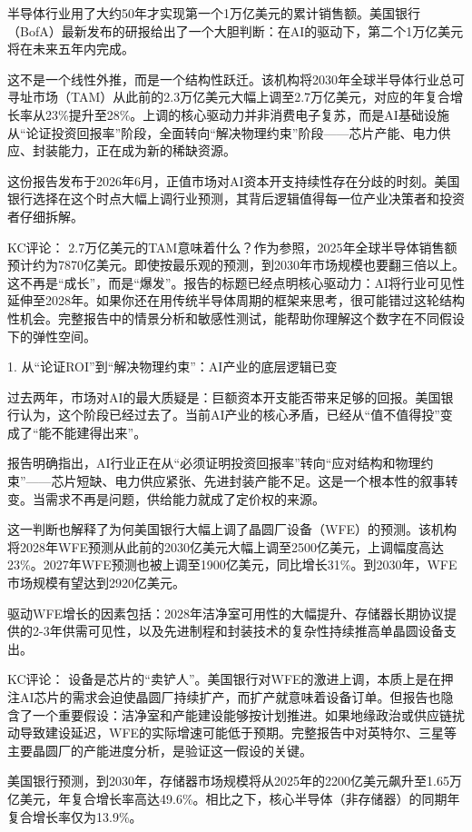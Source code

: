 \documentclass[11pt]{ctexart}
\begin{document}
半导体行业用了大约50年才实现第一个1万亿美元的累计销售额。美国银行（BofA）最新发布的研报给出了一个大胆判断：在AI的驱动下，第二个1万亿美元将在未来五年内完成。

这不是一个线性外推，而是一个结构性跃迁。该机构将2030年全球半导体行业总可寻址市场（TAM）从此前的2.3万亿美元大幅上调至2.7万亿美元，对应的年复合增长率从23\%提升至28\%。上调的核心驱动力并非消费电子复苏，而是AI基础设施从“论证投资回报率”阶段，全面转向“解决物理约束”阶段——芯片产能、电力供应、封装能力，正在成为新的稀缺资源。

这份报告发布于2026年6月，正值市场对AI资本开支持续性存在分歧的时刻。美国银行选择在这个时点大幅上调行业预测，其背后逻辑值得每一位产业决策者和投资者仔细拆解。

KC评论： 2.7万亿美元的TAM意味着什么？作为参照，2025年全球半导体销售额预计约为7870亿美元。即使按最乐观的预测，到2030年市场规模也要翻三倍以上。这不再是“成长”，而是“爆发”。报告的标题已经点明核心驱动力：AI将行业可见性延伸至2028年。如果你还在用传统半导体周期的框架来思考，很可能错过这轮结构性机会。完整报告中的情景分析和敏感性测试，能帮助你理解这个数字在不同假设下的弹性空间。

1. 从“论证ROI”到“解决物理约束”：AI产业的底层逻辑已变

过去两年，市场对AI的最大质疑是：巨额资本开支能否带来足够的回报。美国银行认为，这个阶段已经过去了。当前AI产业的核心矛盾，已经从“值不值得投”变成了“能不能建得出来”。

报告明确指出，AI行业正在从“必须证明投资回报率”转向“应对结构和物理约束”——芯片短缺、电力供应紧张、先进封装产能不足。这是一个根本性的叙事转变。当需求不再是问题，供给能力就成了定价权的来源。

这一判断也解释了为何美国银行大幅上调了晶圆厂设备（WFE）的预测。该机构将2028年WFE预测从此前的2030亿美元大幅上调至2500亿美元，上调幅度高达23\%。2027年WFE预测也被上调至1900亿美元，同比增长31\%。到2030年，WFE市场规模有望达到2920亿美元。

驱动WFE增长的因素包括：2028年洁净室可用性的大幅提升、存储器长期协议提供的2-3年供需可见性，以及先进制程和封装技术的复杂性持续推高单晶圆设备支出。

KC评论： 设备是芯片的“卖铲人”。美国银行对WFE的激进上调，本质上是在押注AI芯片的需求会迫使晶圆厂持续扩产，而扩产就意味着设备订单。但报告也隐含了一个重要假设：洁净室和产能建设能够按计划推进。如果地缘政治或供应链扰动导致建设延迟，WFE的实际增速可能低于预期。完整报告中对英特尔、三星等主要晶圆厂的产能进度分析，是验证这一假设的关键。

美国银行预测，到2030年，存储器市场规模将从2025年的2200亿美元飙升至1.65万亿美元，年复合增长率高达49.6\%。相比之下，核心半导体（非存储器）的同期年复合增长率仅为13.9\%。
\end{document}
